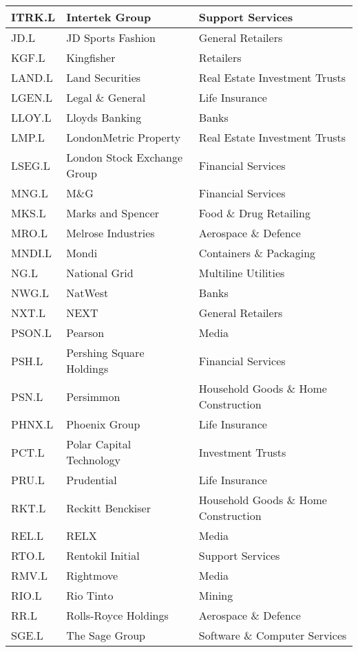 \begin{longtable}{|p{2cm}|p{4cm}|p{6cm}|}
ITRK.L & Intertek Group & Support Services \\ \hline
JD.L & JD Sports Fashion & General Retailers \\ \hline
KGF.L & Kingfisher & Retailers \\ \hline
LAND.L & Land Securities & Real Estate Investment Trusts \\ \hline
LGEN.L & Legal \& General & Life Insurance \\ \hline
LLOY.L & Lloyds Banking & Banks \\ \hline
LMP.L & LondonMetric Property & Real Estate Investment Trusts \\ \hline
LSEG.L & London Stock Exchange Group & Financial Services \\ \hline
MNG.L & M\&G & Financial Services \\ \hline
MKS.L & Marks and Spencer &  Food \& Drug Retailing \\ \hline
MRO.L & Melrose Industries & Aerospace \& Defence \\ \hline
MNDI.L & Mondi & Containers \& Packaging \\ \hline
NG.L & National Grid & Multiline Utilities \\ \hline
NWG.L & NatWest & Banks \\ \hline
NXT.L & NEXT & General Retailers \\ \hline
PSON.L & Pearson & Media \\ \hline
PSH.L & Pershing Square Holdings & Financial Services \\ \hline
PSN.L & Persimmon & Household Goods \& Home Construction \\ \hline
PHNX.L & Phoenix Group & Life Insurance \\ \hline
PCT.L & Polar Capital Technology & Investment Trusts \\ \hline
PRU.L & Prudential & Life Insurance \\ \hline
RKT.L & Reckitt Benckiser & Household Goods \& Home Construction \\ \hline
REL.L & RELX & Media \\ \hline
RTO.L & Rentokil Initial & Support Services \\ \hline
RMV.L & Rightmove & Media \\ \hline
RIO.L & Rio Tinto & Mining \\ \hline
RR.L & Rolls-Royce Holdings & Aerospace \& Defence \\ \hline
SGE.L & The Sage Group & Software \& Computer Services \\ \hline

\end{longtable}
